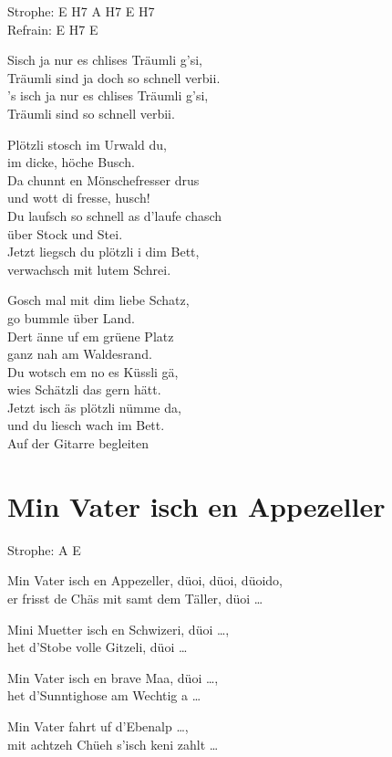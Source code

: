 \documentclass[
  letterpaper,
  a5paper]{memoir}
\begin{document}
Strophe: E H7 A H7 E H7\\
Refrain: E H7 E

S\textquotesingle isch ja nur es chlises Träumli g'si,\\
Träumli sind ja doch so schnell verbii.\\
's isch ja nur es chlises Träumli g'si,\\
Träumli sind so schnell verbii.

Plötzli stosch im Urwald du,\\
im dicke, höche Busch.\\
Da chunnt en Mönschefresser drus\\
und wott di fresse, husch!\\
Du laufsch so schnell as d'laufe chasch\\
über Stock und Stei.\\
Jetzt liegsch du plötzli i dim Bett,\\
verwachsch mit lutem Schrei.

Gosch mal mit dim liebe Schatz,\\
go bummle über Land.\\
Dert änne uf em grüene Platz\\
ganz nah am Waldesrand.\\
Du wotsch em no es Küssli gä,\\
wies Schätzli das gern hätt.\\
Jetzt isch äs plötzli nümme da,\\
und du liesch wach im Bett.\\
Auf der Gitarre begleiten

\hypertarget{min-vater-isch-en-appezeller}{%
\chapter{Min Vater isch en
Appezeller}\label{min-vater-isch-en-appezeller}}

Strophe: A E

Min Vater isch en Appezeller, düoi, düoi, düoido,\\
er frisst de Chäs mit samt dem Täller, düoi \ldots{}

Mini Muetter isch en Schwizeri, düoi \ldots,\\
het d'Stobe volle Gitzeli, düoi \ldots{}

Min Vater isch en brave Maa, düoi \ldots,\\
het d'Sunntighose am Wechtig a \ldots{}

Min Vater fahrt uf d'Ebenalp \ldots,\\
mit achtzeh Chüeh s'isch keni zahlt \ldots{}
\end{document}

